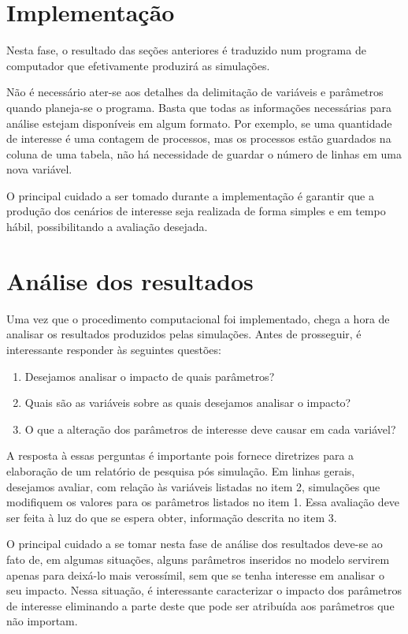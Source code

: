 \documentclass[]{book}
\providecommand{\tightlist}{%
  \setlength{\itemsep}{0pt}\setlength{\parskip}{0pt}}
\begin{document}
\section{Implementação}\label{implementacao}

Nesta fase, o resultado das seções anteriores é traduzido num programa
de computador que efetivamente produzirá as simulações.

Não é necessário ater-se aos detalhes da delimitação de variáveis e
parâmetros quando planeja-se o programa. Basta que todas as informações
necessárias para análise estejam disponíveis em algum formato. Por
exemplo, se uma quantidade de interesse é uma contagem de processos, mas
os processos estão guardados na coluna de uma tabela, não há necessidade
de guardar o número de linhas em uma nova variável.

O principal cuidado a ser tomado durante a implementação é garantir que
a produção dos cenários de interesse seja realizada de forma simples e
em tempo hábil, possibilitando a avaliação desejada.

\section{Análise dos resultados}\label{analise-dos-resultados}

Uma vez que o procedimento computacional foi implementado, chega a hora
de analisar os resultados produzidos pelas simulações. Antes de
prosseguir, é interessante responder às seguintes questões:

\begin{enumerate}
\def\labelenumi{\arabic{enumi}.}
\tightlist
\item
  Desejamos analisar o impacto de quais parâmetros?
\item
  Quais são as variáveis sobre as quais desejamos analisar o impacto?
\item
  O que a alteração dos parâmetros de interesse deve causar em cada
  variável?
\end{enumerate}

A resposta à essas perguntas é importante pois fornece diretrizes para a
elaboração de um relatório de pesquisa pós simulação. Em linhas gerais,
desejamos avaliar, com relação às variáveis listadas no item 2,
simulações que modifiquem os valores para os parâmetros listados no item
1. Essa avaliação deve ser feita à luz do que se espera obter,
informação descrita no item 3.

O principal cuidado a se tomar nesta fase de análise dos resultados
deve-se ao fato de, em algumas situações, alguns parâmetros inseridos no
modelo servirem apenas para deixá-lo mais verossímil, sem que se tenha
interesse em analisar o seu impacto. Nessa situação, é interessante
caracterizar o impacto dos parâmetros de interesse eliminando a parte
deste que pode ser atribuída aos parâmetros que não importam.
\end{document}
